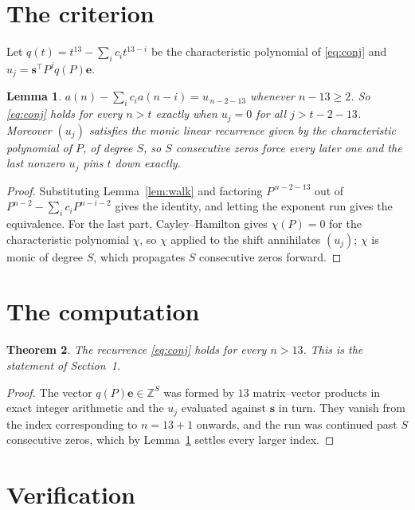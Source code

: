 \documentclass[11pt,a4paper]{article}
\theoremstyle{plain}
\newtheorem{theorem}{Theorem}
\newtheorem{lemma}[theorem]{Lemma}
\theoremstyle{definition}
\begin{document}
\section{The criterion}

Let $q(t)=t^{13}-\sum_i c_i t^{13-i}$ be the characteristic polynomial of
\eqref{eq:conj} and $u_j=\mathbf{s}^{\!\top}P^{j}q(P)\mathbf{e}$.

\begin{lemma}\label{lem:crit}
$a(n)-\sum_i c_i a(n-i)=u_{\,n-2-13}$ whenever $n-13\ge2$. So \eqref{eq:conj}
holds for every $n>t$ exactly when $u_j=0$ for all $j>t-2-13$. Moreover $(u_j)$
satisfies the monic linear recurrence given by the characteristic polynomial of $P$, of
degree $S$, so $S$ consecutive zeros force every later one and the last nonzero $u_j$ pins
$t$ down exactly.
\end{lemma}

\begin{proof}
Substituting Lemma~\ref{lem:walk} and factoring $P^{\,n-2-13}$ out of
$P^{n-2}-\sum_i c_i P^{n-i-2}$ gives the identity, and letting the exponent run gives the
equivalence. For the last part, Cayley--Hamilton gives $\chi(P)=0$ for the characteristic
polynomial $\chi$, so $\chi$ applied to the shift annihilates $(u_j)$; $\chi$ is monic of
degree $S$, which propagates $S$ consecutive zeros forward.
\end{proof}

\section{The computation}

\begin{theorem}
The recurrence \eqref{eq:conj} holds for every $n>13$. This is the statement of
Section~1.
\end{theorem}

\begin{proof}
The vector $q(P)\mathbf{e}\in\mathbb{Z}^{S}$ was formed by $13$ matrix--vector
products in exact integer arithmetic and the $u_j$ evaluated against $\mathbf{s}$ in turn.
They vanish from the index corresponding to $n=13+1$ onwards, and the run was continued
past $S$ consecutive zeros, which by Lemma~\ref{lem:crit} settles every larger index.
\end{proof}

\section{Verification}
\end{document}
